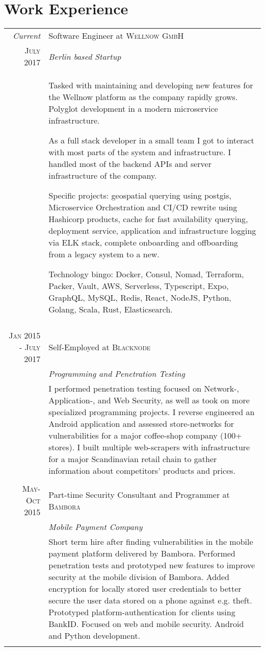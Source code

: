 \documentclass[a4paper,10pt]{article}
\begin{document}
\section{Work Experience}
\begin{tabular}{r|p{11cm}}
 \emph{Current} & Software Engineer at \textsc{Wellnow GmbH} \\
 \textsc{July 2017}&\emph{Berlin based Startup}\\
 &\footnotesize{
 Tasked with maintaining and developing new features for the Wellnow platform as the company rapidly grows. 
 Polyglot development in a modern microservice infrastructure. 

 As a full stack developer in a small team I got to interact with most parts of the system and infrastructure. I handled most of the backend APIs
 and server infrastructure of the company.
 
 Specific projects: geospatial querying using postgis, Microservice Orchestration and CI/CD rewrite using Hashicorp products, 
 cache for fast availability querying, deployment service, application and infrastructure logging via ELK stack, complete onboarding and offboarding
 from a legacy system to a new.
 
 Technology bingo: Docker, Consul, Nomad, Terraform, Packer, Vault, AWS, Serverless, Typescript, Expo, GraphQL, MySQL, 
 Redis, React, NodeJS, Python, Golang, Scala, Rust, Elasticsearch.}\\ \multicolumn{2}{c}{} \\

 \textsc{Jan 2015 - July 2017} & Self-Employed at \textsc{Blacknode} \\
 &\emph{Programming and Penetration Testing}\\
 &\footnotesize{I performed penetration testing focused on Network-, Application-, and Web Security, as well as took
 on more specialized programming projects. I reverse engineered an Android application and assessed store-networks
 for vulnerabilities for a major coffee-shop company (100+ stores). I built multiple web-scrapers with infrastructure 
 for a major Scandinavian retail chain to gather information about competitors' products and prices.}\\\multicolumn{2}{c}{} \\
 
 \textsc{May-Oct 2015} & Part-time Security Consultant and Programmer at \textsc{Bambora}\\
 &\emph{Mobile Payment Company}\\&\footnotesize{Short term hire after finding vulnerabilities in the 
 mobile payment platform delivered by Bambora. Performed penetration tests and prototyped new 
 features to improve security at the mobile division of Bambora. Added encryption for locally stored 
 user credentials to better secure the user data stored on a phone against e.g. theft. Prototyped 
 platform-authentication for clients using BankID. Focused on web and mobile security. 
 Android and Python development.}\\\multicolumn{2}{c}{} \\
 

\end{tabular}
\end{document}
